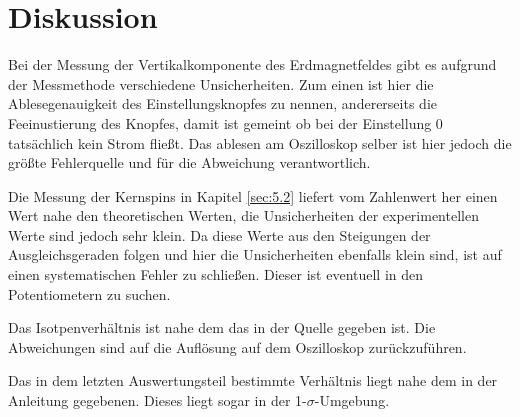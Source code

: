 \section{Diskussion}
\label{sec:Diskussion}

Bei der Messung der Vertikalkomponente des Erdmagnetfeldes gibt es aufgrund der Messmethode
verschiedene Unsicherheiten.
Zum einen ist hier die Ablesegenauigkeit des Einstellungsknopfes zu nennen,
andererseits die Feeinustierung des Knopfes, damit ist gemeint ob bei der Einstellung 0
tatsächlich kein Strom fließt.
Das ablesen am Oszilloskop selber ist hier jedoch die größte Fehlerquelle und
für die Abweichung verantwortlich.

Die Messung der Kernspins in Kapitel \ref{sec:5.2} liefert vom Zahlenwert her
einen Wert nahe den theoretischen Werten, die Unsicherheiten der experimentellen Werte sind jedoch sehr klein.
Da diese Werte aus den Steigungen der Ausgleichsgeraden folgen und hier die Unsicherheiten ebenfalls klein sind, ist auf einen systematischen Fehler zu schließen.
Dieser ist eventuell in den Potentiometern zu suchen.

Das Isotpenverhältnis ist nahe dem das in der Quelle gegeben ist.
Die Abweichungen sind auf die Auflösung auf dem Oszilloskop zurückzuführen.

Das in dem letzten Auswertungsteil bestimmte Verhältnis
liegt nahe dem in der Anleitung gegebenen.
Dieses liegt sogar in der 1-$σ$-Umgebung.
